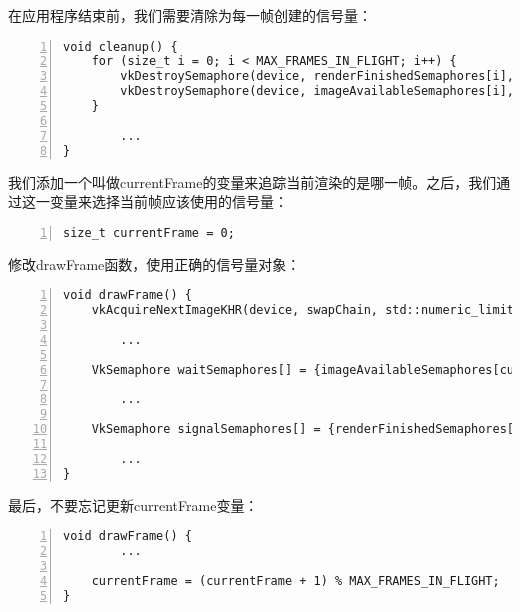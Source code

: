 \documentclass{ctexart}
\begin{document}
在应用程序结束前，我们需要清除为每一帧创建的信号量：

\begin{lstlisting}[language={[ANSI]C},keywordstyle=\color{blue!70},commentstyle=\color{red!50!green!50!blue!50},frame=shadowbox, rulesepcolor=\color{red!20!green!20!blue!20},basicstyle=\small,numbers=left, numberstyle=\tiny,breaklines=true]
void cleanup() {
	for (size_t i = 0; i < MAX_FRAMES_IN_FLIGHT; i++) {
		vkDestroySemaphore(device, renderFinishedSemaphores[i], nullptr);
		vkDestroySemaphore(device, imageAvailableSemaphores[i], nullptr);
	}

		...
}
\end{lstlisting}

我们添加一个叫做currentFrame的变量来追踪当前渲染的是哪一帧。之后，我们通过这一变量来选择当前帧应该使用的信号量：

\begin{lstlisting}[language={[ANSI]C},keywordstyle=\color{blue!70},commentstyle=\color{red!50!green!50!blue!50},frame=shadowbox, rulesepcolor=\color{red!20!green!20!blue!20},basicstyle=\small,numbers=left, numberstyle=\tiny,breaklines=true]
size_t currentFrame = 0;
\end{lstlisting}

修改drawFrame函数，使用正确的信号量对象：

\begin{lstlisting}[language={[ANSI]C},keywordstyle=\color{blue!70},commentstyle=\color{red!50!green!50!blue!50},frame=shadowbox, rulesepcolor=\color{red!20!green!20!blue!20},basicstyle=\small,numbers=left, numberstyle=\tiny,breaklines=true]
void drawFrame() {
	vkAcquireNextImageKHR(device, swapChain, std::numeric_limits<uint64_t>::max(), imageAvailableSemaphores[currentFrame], VK_NULL_HANDLE, &imageIndex);

		...

	VkSemaphore waitSemaphores[] = {imageAvailableSemaphores[currentFrame]};

		...

	VkSemaphore signalSemaphores[] = {renderFinishedSemaphores[currentFrame]};

		...
}
\end{lstlisting}

最后，不要忘记更新currentFrame变量：

\begin{lstlisting}[language={[ANSI]C},keywordstyle=\color{blue!70},commentstyle=\color{red!50!green!50!blue!50},frame=shadowbox, rulesepcolor=\color{red!20!green!20!blue!20},basicstyle=\small,numbers=left, numberstyle=\tiny,breaklines=true]
void drawFrame() {
		...

	currentFrame = (currentFrame + 1) % MAX_FRAMES_IN_FLIGHT;
}
\end{lstlisting}
\end{document}

